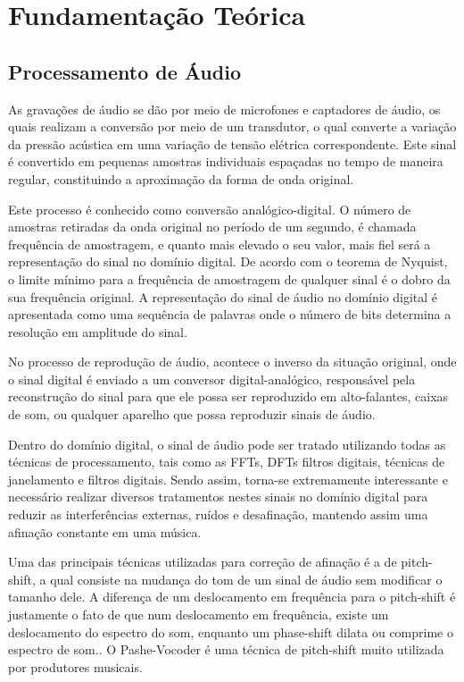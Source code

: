 \chapter{Fundamentação Teórica}\label{cap:CnptDsng}

\section*{Processamento de Áudio}\label{sec:esc_freq}
As gravações de áudio se dão por meio de microfones e captadores de áudio, os quais realizam a conversão por meio de um transdutor, o qual converte a variação da pressão acústica em uma variação de tensão elétrica correspondente. Este sinal é convertido em pequenas amostras individuais espaçadas no tempo de maneira regular, constituindo a aproximação da forma de onda original.

Este processo é conhecido como conversão analógico-digital. O número de amostras retiradas da onda original no período de um segundo, é chamada frequência de amostragem, e quanto mais elevado o seu valor, mais fiel será a representação do sinal no domínio digital. De acordo com o teorema de Nyquist, o limite mínimo para a frequência de amostragem de qualquer sinal é o dobro da sua frequência original. A representação do sinal de áudio no domínio digital é apresentada como uma sequência de palavras onde o número de bits determina a resolução em amplitude do sinal.

No processo de reprodução de áudio, acontece o inverso da situação original, onde o sinal digital é enviado a um conversor digital-analógico, responsável pela reconstrução do sinal para que ele possa ser reproduzido em alto-falantes, caixas de som, ou qualquer aparelho que possa reproduzir sinais de áudio.

Dentro do domínio digital, o sinal de áudio pode ser tratado utilizando todas as técnicas de processamento, tais como as FFTs, DFTs filtros digitais, técnicas de janelamento e filtros digitais. Sendo assim, torna-se extremamente interessante e necessário realizar diversos tratamentos nestes sinais no domínio digital para reduzir as interferências externas, ruídos e desafinação, mantendo assim uma afinação constante em uma música. 

Uma das principais técnicas utilizadas para correção de afinação é a de pitch-shift, a qual consiste na mudança do tom de um sinal de áudio sem modificar o tamanho dele. A diferença de um deslocamento em frequência para o pitch-shift é justamente o fato de que num deslocamento em frequência, existe um deslocamento do espectro do som, enquanto um phase-shift dilata ou comprime o espectro de som.. O Pashe-Vocoder é uma técnica de pitch-shift muito utilizada por produtores musicais. 


